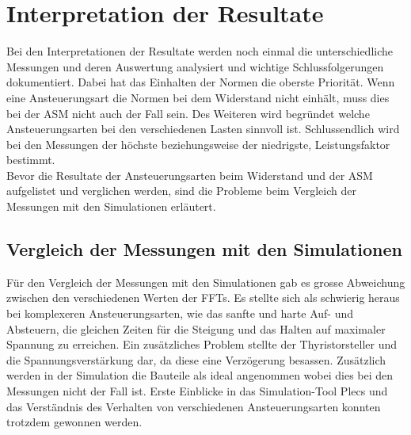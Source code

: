\section{Interpretation der Resultate}\label{sec:Interpretation_Resultate}
Bei den Interpretationen der Resultate werden noch einmal die unterschiedliche Messungen und deren Auswertung analysiert und wichtige Schlussfolgerungen dokumentiert. Dabei hat das Einhalten der Normen die oberste Priorität. Wenn eine Ansteuerungsart die Normen bei dem Widerstand nicht einhält, muss dies bei der ASM nicht auch der Fall sein. Des Weiteren wird begründet welche Ansteuerungsarten bei den verschiedenen Lasten sinnvoll ist. Schlussendlich wird bei den Messungen der höchste beziehungsweise der niedrigste, Leistungsfaktor bestimmt.\\
Bevor die Resultate der Ansteuerungsarten beim Widerstand und der ASM aufgelistet und verglichen werden, sind die Probleme beim Vergleich der Messungen mit den Simulationen erläutert.

\subsection{Vergleich der Messungen mit den Simulationen}
Für den Vergleich der Messungen mit den Simulationen gab es grosse Abweichung zwischen den verschiedenen Werten der FFTs. Es stellte sich als schwierig heraus bei komplexeren Ansteuerungsarten, wie das sanfte und harte Auf- und Absteuern, die gleichen Zeiten für die Steigung und das Halten auf maximaler Spannung zu erreichen. Ein zusätzliches Problem stellte der Thyristorsteller und die Spannungsverstärkung dar, da diese eine Verzögerung besassen. Zusätzlich werden in der Simulation die Bauteile als ideal angenommen wobei dies bei den Messungen nicht der Fall ist. Erste Einblicke in das Simulation-Tool Plecs und das Verständnis des Verhalten von verschiedenen Ansteuerungsarten konnten trotzdem gewonnen werden. 


